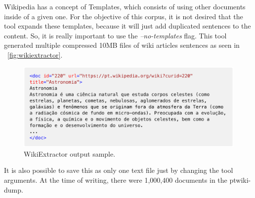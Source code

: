 
Wikipedia has a concept of Templates, which consists of using other documents inside of a given one. For the objective of this corpus, it is not desired that the tool expands these templates, because it will just add duplicated sentences to the content. So, it is really important to use the \textit{–no-templates} flag.
This tool generated multiple compressed 10MB files of wiki articles sentences as seen in ~\autoref{fig:wikiextractor}.

\begin{figure}[h]
	\caption{WikiExtractor output sample.}
	\label{fig:wikiextractor}
	\centering%
	\begin{minipage}{.9\textwidth}
		\includegraphics[width=\textwidth]{wikiextractor.png}
	\end{minipage}
\end{figure}




It is also possible to save this as only one text file just by changing the tool arguments.
At the time of writing, there were 1,000,400 documents in the ptwiki-dump.

